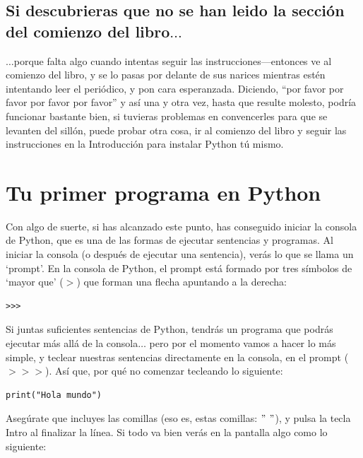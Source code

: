\subsection*{\color{BrickRed}Si descubrieras que no se han leido la sección del comienzo del libro$\ldots$}

$\ldots$porque falta algo cuando intentas seguir las instrucciones---entonces ve al comienzo del libro, y se lo pasas por delante de sus narices mientras estén intentando leer el periódico, y pon cara esperanzada. Diciendo, ``por favor por favor por favor por favor'' y así una y otra vez, hasta que resulte molesto, podría funcionar bastante bien, si tuvieras problemas en convencerles para que se levanten del sillón, puede probar otra cosa, ir al comienzo del libro y seguir las instrucciones en la Introducción para instalar Python tú mismo.

\section{Tu primer programa en Python}

Con algo de suerte, si has alcanzado este punto, has conseguido iniciar la consola de Python, que es una de las formas de ejecutar sentencias y programas. Al iniciar la consola (o después de ejecutar una sentencia), verás lo que se llama un `prompt'. En la consola de Python, el prompt está formado por tres símbolos de `mayor que' ($>$) que forman una flecha apuntando a la derecha:

\begin{listing}
\begin{verbatim}
>>>
\end{verbatim}
\end{listing}

Si juntas suficientes sentencias de Python, tendrás un programa que podrás ejecutar más allá de la consola$\ldots$ pero por el momento vamos a hacer lo más simple, y teclear nuestras sentencias directamente en la consola, en el prompt ($>>>$).  Así que, por qué no comenzar tecleando lo siguiente:

\begin{listing}
\begin{verbatim}
print("Hola mundo")
\end{verbatim}
\end{listing}

Asegúrate que incluyes las comillas (eso es, estas comillas: $"$ $"$), y pulsa la tecla Intro al finalizar la línea. Si todo va bien verás en la pantalla algo como lo siguiente:

